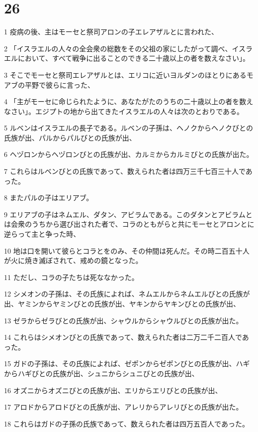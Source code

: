\chapter{26}

\par 1 疫病の後、主はモーセと祭司アロンの子エレアザルとに言われた、
\par 2 「イスラエルの人々の全会衆の総数をその父祖の家にしたがって調べ、イスラエルにおいて、すべて戦争に出ることのできる二十歳以上の者を数えなさい」。
\par 3 そこでモーセと祭司エレアザルとは、エリコに近いヨルダンのほとりにあるモアブの平野で彼らに言った、
\par 4 「主がモーセに命じられたように、あなたがたのうちの二十歳以上の者を数えなさい」。エジプトの地から出てきたイスラエルの人々は次のとおりである。
\par 5 ルベンはイスラエルの長子である。ルベンの子孫は、ヘノクからヘノクびとの氏族が出、パルからパルびとの氏族が出、
\par 6 ヘヅロンからヘヅロンびとの氏族が出、カルミからカルミびとの氏族が出た。
\par 7 これらはルベンびとの氏族であって、数えられた者は四万三千七百三十人であった。
\par 8 またパルの子はエリアブ。
\par 9 エリアブの子はネムエル、ダタン、アビラムである。このダタンとアビラムとは会衆のうちから選び出された者で、コラのともがらと共にモーセとアロンとに逆らって主と争った時、
\par 10 地は口を開いて彼らとコラとをのみ、その仲間は死んだ。その時二百五十人が火に焼き滅ぼされて、戒めの鏡となった。
\par 11 ただし、コラの子たちは死ななかった。
\par 12 シメオンの子孫は、その氏族によれば、ネムエルからネムエルびとの氏族が出、ヤミンからヤミンびとの氏族が出、ヤキンからヤキンびとの氏族が出、
\par 13 ゼラからゼラびとの氏族が出、シャウルからシャウルびとの氏族が出た。
\par 14 これらはシメオンびとの氏族であって、数えられた者は二万二千二百人であった。
\par 15 ガドの子孫は、その氏族によれば、ゼポンからゼポンびとの氏族が出、ハギからハギびとの氏族が出、シュニからシュニびとの氏族が出、
\par 16 オズニからオズニびとの氏族が出、エリからエリびとの氏族が出、
\par 17 アロドからアロドびとの氏族が出、アレリからアレリびとの氏族が出た。
\par 18 これらはガドの子孫の氏族であって、数えられた者は四万五百人であった。
